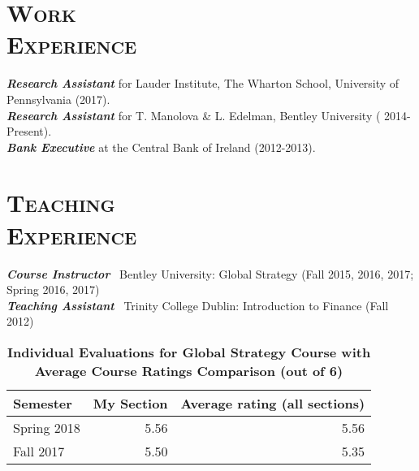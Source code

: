 \documentclass[margin, 12pt]{res}
\begin{document}
\begin{resume}
\begin{itemize}
\end{itemize}



\section{\normalfont\textsc{Work \\Experience}}
\textbf{\textit{Research Assistant}} for Lauder Institute, The Wharton School, University of Pennsylvania (2017). \\
\textbf{\textit{Research Assistant}} for T. Manolova \& L. Edelman, Bentley University ( 2014-Present). \\
\textbf{\textit{Bank Executive}} at the Central Bank of Ireland (2012-2013). 


\section{\normalfont\textsc{Teaching \\Experience}}
\textbf{\textit{Course Instructor}}~ Bentley University:
Global Strategy (Fall 2015, 2016, 2017; Spring 2016, 2017) \\
\textbf{\textit{Teaching Assistant}}~ Trinity College Dublin:
Introduction to Finance (Fall 2012)
 
%
 
\begin{table}[htbp]
  \centering
  \caption{\textbf{Individual Evaluations for Global Strategy Course	with Average Course Ratings Comparison (out of 6)}}
    \begin{tabular}{lrr}
    \midrule
    Semester & My Section & Average rating (all sections) \\
    \midrule
    Spring 2018 & 5.56  & 5.56 \\
    Fall 2017 & 5.50  & 5.35 \\


\end{tabular}
\end{table}
\end{resume}
\end{document}
